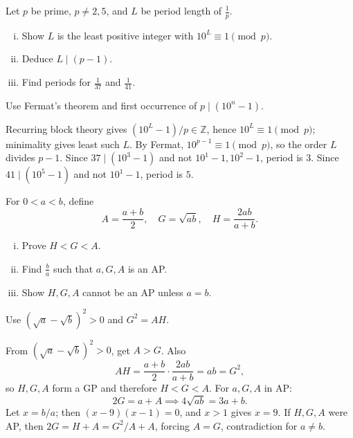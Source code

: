 \begin{problem}
Let $p$ be prime, $p\neq2,5$, and $L$ be period length of $\frac1p$.
\begin{enumerate}[(i)]
\item Show $L$ is the least positive integer with $10^L\equiv1\pmod p$.
\item Deduce $L\mid(p-1)$.
\item Find periods for $\frac1{37}$ and $\frac1{41}$.
\end{enumerate}
\end{problem}
\begin{hint}
Use Fermat's theorem and first occurrence of $p\mid(10^n-1)$.
\end{hint}
\begin{solution}
Recurring block theory gives $(10^L-1)/p\in\mathbb{Z}$, hence $10^L\equiv1\pmod p$; minimality gives least such $L$.
By Fermat, $10^{p-1}\equiv1\pmod p$, so the order $L$ divides $p-1$.
Since $37\mid(10^3-1)$ and not $10^1-1,10^2-1$, period is $3$.
Since $41\mid(10^5-1)$ and not $10^1-1$, period is $5$.
\end{solution}

\begin{problem}
For $0<a<b$, define
\[
A=\frac{a+b}{2},\quad G=\sqrt{ab},\quad H=\frac{2ab}{a+b}.
\]
\begin{enumerate}[(i)]
\item Prove $H<G<A$.
\item Find $\frac ba$ such that $a,G,A$ is an AP.
\item Show $H,G,A$ cannot be an AP unless $a=b$.
\end{enumerate}
\end{problem}
\begin{hint}
Use $(\sqrt a-\sqrt b)^2>0$ and $G^2=AH$.
\end{hint}
\begin{solution}
From $(\sqrt a-\sqrt b)^2>0$, get $A>G$. Also
\[
AH=\frac{a+b}{2}\cdot\frac{2ab}{a+b}=ab=G^2,
\]
so $H,G,A$ form a GP and therefore $H<G<A$.
For $a,G,A$ in AP:
\[
2G=a+A \implies 4\sqrt{ab}=3a+b.
\]
Let $x=b/a$; then $(x-9)(x-1)=0$, and $x>1$ gives $x=9$.
If $H,G,A$ were AP, then $2G=H+A=G^2/A+A$, forcing $A=G$, contradiction for $a\ne b$.
\end{solution}

